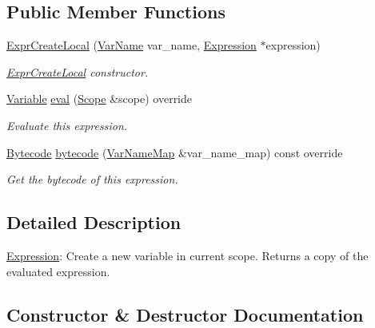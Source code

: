 \subsection*{Public Member Functions}
\begin{DoxyCompactItemize}
\item 
\hyperlink{classcreek_1_1_expr_create_local_aac4730267bd9d1ce7eaad3d191f47cf3}{Expr\+Create\+Local} (\hyperlink{classcreek_1_1_var_name}{Var\+Name} var\+\_\+name, \hyperlink{classcreek_1_1_expression}{Expression} $\ast$expression)
\begin{DoxyCompactList}\small\item\em {\ttfamily \hyperlink{classcreek_1_1_expr_create_local}{Expr\+Create\+Local}} constructor. \end{DoxyCompactList}\item 
\hyperlink{classcreek_1_1_variable}{Variable} \hyperlink{classcreek_1_1_expr_create_local_a1f3f2597f512437ec135c79d012e9ad8}{eval} (\hyperlink{classcreek_1_1_scope}{Scope} \&scope) override
\begin{DoxyCompactList}\small\item\em Evaluate this expression. \end{DoxyCompactList}\item 
\hyperlink{classcreek_1_1_bytecode}{Bytecode} \hyperlink{classcreek_1_1_expr_create_local_a0e8f31cd3397a67a6ee09a1165fbb52b}{bytecode} (\hyperlink{classcreek_1_1_var_name_map}{Var\+Name\+Map} \&var\+\_\+name\+\_\+map) const  override\hypertarget{classcreek_1_1_expr_create_local_a0e8f31cd3397a67a6ee09a1165fbb52b}{}\label{classcreek_1_1_expr_create_local_a0e8f31cd3397a67a6ee09a1165fbb52b}

\begin{DoxyCompactList}\small\item\em Get the bytecode of this expression. \end{DoxyCompactList}\end{DoxyCompactItemize}


\subsection{Detailed Description}
\hyperlink{classcreek_1_1_expression}{Expression}\+: Create a new variable in current scope. Returns a copy of the evaluated expression. 

\subsection{Constructor \& Destructor Documentation}

